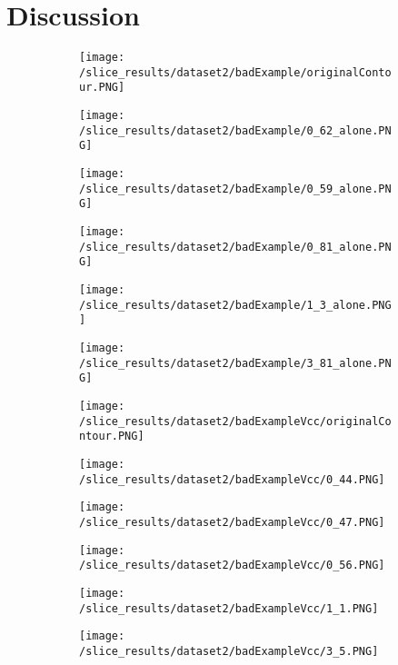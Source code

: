 \documentclass[thesis.tex]{subfiles}
\begin{document}
\section{Discussion}
\begin{figure}[!htb]
\centering
\begin{subfigure}{0.25\textwidth}
		\texttt{[image: /slice\_results/dataset2/badExample/originalContour.PNG]}
	\caption{}		
	\end{subfigure}
\begin{subfigure}{0.25\textwidth}
		\texttt{[image: /slice\_results/dataset2/badExample/0\_62\_alone.PNG]}
	\caption{}		
	\end{subfigure}
\begin{subfigure}{0.25\textwidth}
		\texttt{[image: /slice\_results/dataset2/badExample/0\_59\_alone.PNG]}
	\caption{}		
	\end{subfigure}

\begin{subfigure}{0.25\textwidth}
		\texttt{[image: /slice\_results/dataset2/badExample/0\_81\_alone.PNG]}
	\caption{}		
	\end{subfigure}
\begin{subfigure}{0.25\textwidth}
		\texttt{[image: /slice\_results/dataset2/badExample/1\_3\_alone.PNG]}
	\caption{}		
	\end{subfigure}
\begin{subfigure}{0.25\textwidth}
		\texttt{[image: /slice\_results/dataset2/badExample/3\_81\_alone.PNG]}
	\caption{}		
	\end{subfigure}

\begin{subfigure}{0.25\textwidth}
		\texttt{[image: /slice\_results/dataset2/badExampleVcc/originalContour.PNG]}
	\caption{}		
	\end{subfigure}
\begin{subfigure}{0.25\textwidth}
		\texttt{[image: /slice\_results/dataset2/badExampleVcc/0\_44.PNG]}
	\caption{}
	\label{vccexcept}		
	\end{subfigure}
\begin{subfigure}{0.25\textwidth}
		\texttt{[image: /slice\_results/dataset2/badExampleVcc/0\_47.PNG]}
	\caption{}		
	\end{subfigure}

\begin{subfigure}{0.25\textwidth}
		\texttt{[image: /slice\_results/dataset2/badExampleVcc/0\_56.PNG]}
	\caption{}		
	\end{subfigure}
\begin{subfigure}{0.25\textwidth}
		\texttt{[image: /slice\_results/dataset2/badExampleVcc/1\_1.PNG]}
	\caption{}		
	\end{subfigure}
\begin{subfigure}{0.25\textwidth}
		\texttt{[image: /slice\_results/dataset2/badExampleVcc/3\_5.PNG]}
	\caption{}		
	\end{subfigure}


\end{figure}
\end{document}
